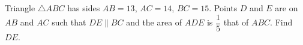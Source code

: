 Triangle $\triangle ABC$ has sides $AB = 13$, $AC = 14$, $BC = 15$. Points $D$ and $E$ are on $AB$ and $AC$ such that $DE\parallel BC$ and the area of $ADE$ is $\dfrac{1}{5}$ that of $ABC$. Find $DE$.
